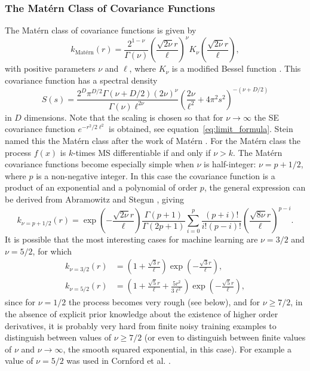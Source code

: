\documentclass[11pt]{book}
\begin{document}
\subsubsection{The Matérn Class of Covariance Functions}

The Matérn class of covariance functions is given by
\begin{equation}
\label{eq:matern}
k_{\text{Matérn}}(r) = \frac{2^{1-\nu}}{\Gamma(\nu)} \left(\frac{\sqrt{2\nu}r}{\ell}\right)^\nu K_\nu\left(\frac{\sqrt{2\nu}r}{\ell}\right),
\end{equation}
with positive parameters $\nu$ and $\ell$, where $K_\nu$ is a modified Bessel function \cite{abramowitz1965}. This covariance function has a spectral density
\begin{equation}
\label{eq:matern_spectral}
S(s) = \frac{2^D \pi^{D/2} \Gamma(\nu + D/2) (2\nu)^\nu}{\Gamma(\nu) \ell^{2\nu}} \left(\frac{2\nu}{\ell^2} + 4\pi^2 s^2\right)^{-(\nu+D/2)}
\end{equation}
in $D$ dimensions. Note that the scaling is chosen so that for $\nu \to \infty$ the SE covariance function $e^{-r^2/2\ell^2}$ is obtained, see equation~\eqref{eq:limit_formula}. Stein \cite{stein1999} named this the Matérn class after the work of Matérn \cite{matern1960}. For the Matérn class the process $f(x)$ is $k$-times MS differentiable if and only if $\nu > k$. The Matérn covariance functions become especially simple when $\nu$ is half-integer: $\nu = p + 1/2$, where $p$ is a non-negative integer. In this case the covariance function is a product of an exponential and a polynomial of order $p$, the general expression can be derived from Abramowitz and Stegun \cite{abramowitz1965}, giving
\begin{equation}
\label{eq:matern_half_integer}
k_{\nu=p+1/2}(r) = \exp\left(-\frac{\sqrt{2\nu}r}{\ell}\right) \frac{\Gamma(p+1)}{\Gamma(2p+1)} \sum_{i=0}^p \frac{(p+i)!}{i!(p-i)!} \left(\frac{\sqrt{8\nu}r}{\ell}\right)^{p-i}.
\end{equation}
It is possible that the most interesting cases for machine learning are $\nu = 3/2$ and $\nu = 5/2$, for which
\begin{align}
\label{eq:matern_special_cases}
k_{\nu=3/2}(r) &= \left(1 + \frac{\sqrt{3}r}{\ell}\right) \exp\left(-\frac{\sqrt{3}r}{\ell}\right), \\
k_{\nu=5/2}(r) &= \left(1 + \frac{\sqrt{5}r}{\ell} + \frac{5r^2}{3\ell^2}\right) \exp\left(-\frac{\sqrt{5}r}{\ell}\right), \nonumber
\end{align}
since for $\nu = 1/2$ the process becomes very rough (see below), and for $\nu \geq 7/2$, in the absence of explicit prior knowledge about the existence of higher order derivatives, it is probably very hard from finite noisy training examples to distinguish between values of $\nu \geq 7/2$ (or even to distinguish between finite values of $\nu$ and $\nu \to \infty$, the smooth squared exponential, in this case). For example a value of $\nu = 5/2$ was used in Cornford et al. \cite{cornford2002}.
\end{document}
